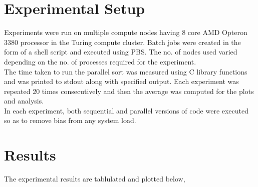 \documentclass[11pt,a4paper,oneside]{article}
\begin{document}
	
	\section{Experimental Setup}
	Experiments were run on multiple compute nodes having 8 core AMD Opteron 3380 processor in the Turing compute cluster. Batch jobs were created in the form of a shell script and executed using PBS. The no. of nodes used varied depending on the no. of processes required for the experiment.\\
	\newline
	The time taken to run the parallel sort was measured using C library functions and was printed to stdout along with specified output. Each experiment was repeated 20 times consecutively and then the average was computed for the plots and analysis. \\
	\newline
	In each experiment, both sequential and parallel versions of code were executed so as to remove bias from any system load. \\
	
	\section{Results}
	
	The experimental results are tablulated and plotted below,
	
\end{document}
